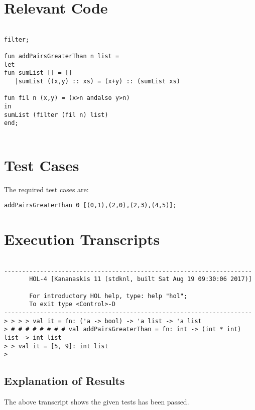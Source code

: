 \documentclass{report}
\begin{document}
\section{Relevant Code}
\label{sec:relevant-code-4}


\lstset{frameround=tttt}
\begin{lstlisting}[frame=tRBL]

filter;

fun addPairsGreaterThan n list =
let
fun sumList [] = []
   |sumList ((x,y) :: xs) = (x+y) :: (sumList xs)

fun fil n (x,y) = (x>n andalso y>n)
in
sumList (filter (fil n) list)
end;


\end{lstlisting}

\section{Test Cases}
\label{sec:test-cases-4}

The required test cases are:
\begin{lstlisting}[frame = tRBL ]
addPairsGreaterThan 0 [(0,1),(2,0),(2,3),(4,5)];
\end{lstlisting}


\section{Execution Transcripts}
\label{sec:exec-transcr-4}

\setcounter{sessioncount}{0}
\begin{session}
  \begin{scriptsize}
\begin{verbatim}

---------------------------------------------------------------------
       HOL-4 [Kananaskis 11 (stdknl, built Sat Aug 19 09:30:06 2017)]

       For introductory HOL help, type: help "hol";
       To exit type <Control>-D
---------------------------------------------------------------------
> > > > val it = fn: ('a -> bool) -> 'a list -> 'a list
> # # # # # # # # val addPairsGreaterThan = fn: int -> (int * int) list -> int list
> > val it = [5, 9]: int list
> 
\end{verbatim}
  \end{scriptsize}
\end{session}

\subsection{Explanation of Results}
\label{sec:explanation-results-4}
The above transcript shows the given tests has been passed.
\end{document}
